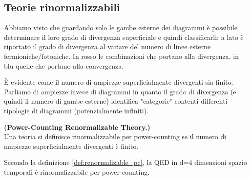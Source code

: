 \documentclass[../main.tex]{subfiles}
\begin{document}
\subsection{Teorie rinormalizzabili}
Abbiamo visto che guardando solo le gambe esterne dei diagrammi è possibile determinare il loro grado di divergenza superficiale e quindi classificarli: a lato è riportato il grado di divergenza al variare del numero di linee esterne fermioniche/fotoniche. In rosso le combinazioni che portano alla divergenza, in blu quelle che portano alla convergenza.

È evidente come il numero di ampiezze superficialmente divergenti sia finito. Parliamo di ampiezze invece di diagrammi in quanto il grado di divergenza (e quindi il numero di gambe esterne) identifica "categorie" contenti differenti tipologie di diagrammi (potenzialmente infiniti).

\begin{definition}
    \textbf{(Power-Counting Renormalizable Theory.)}\\ Una teoria si definisce rinormalizzabile per power-counting se il numero di ampiezze superficialmente divergenti è finito.
    \label{def:renormalizable_pc}
\end{definition}

Secondo la definizione \ref{def:renormalizable_pc}, la QED in d=4 dimensioni spazio temporali è rinormalizzabile per power-counting.
\end{document}
